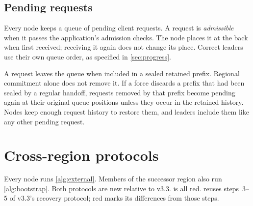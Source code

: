 \documentclass[11pt,a4paper]{article}
\newcounter{protocol}
\begin{document}
\subsection{Pending requests}
\label{sec:requests}
Every node keeps a queue of pending client requests. A request is
\emph{admissible} when it passes the application's admission checks.
The node places it at the back when first received; receiving it again
does not change its place. Correct leaders use their own queue order,
as specified in \cref{sec:progress}.

A request leaves the queue when included in a sealed retained prefix.
Regional commitment alone does not remove it. If a force discards a
prefix that had been sealed by a regular handoff, requests removed by that prefix
become pending again at their original queue positions unless they
occur in the retained history. Nodes keep enough request history to
restore them, and leaders include them
like any other pending request.

\section{Cross-region protocols}
\label{sec:xprotocols}
Every node runs \cref{alg:external}. Members of the successor region
also run \cref{alg:bootstrap}. Both protocols are new relative to v3.3.
 is all red.  reuses steps~3--5
of v3.3's recovery protocol; red marks its differences from those steps.
\end{document}
